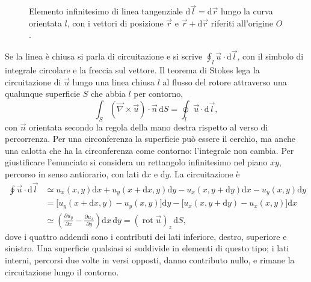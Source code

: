 \documentclass[11pt,a4paper]{article}
\newcommand{\nab}{\vec{\nabla}}
\newcommand{\dd}{\mathrm{d}}
\DeclareMathOperator{\rot}{rot}
\begin{document}
\begin{figure}[htbp]
	\caption{Elemento infinitesimo di linea tangenziale $\mathrm{d}\vec{l} = \mathrm{d}\vec{r}$ lungo la curva orientata $l$, con i vettori di posizione $\vec{r}$ e $\vec{r}+\mathrm{d}\vec{r}$ riferiti all'origine $O$.}
	\label{fig:elemento_linea_curva}
\end{figure}




Se la linea è chiusa si parla di circuitazione e si scrive $\oint_l\vec u\cdot\dd\vec l$, con il simbolo di integrale circolare e la freccia sul vettore. Il teorema di Stokes lega la circuitazione di $\vec u$ lungo una linea chiusa $l$ al flusso del rotore attraverso una qualunque superficie $S$ che abbia $l$ per contorno,
\[
\int_S(\nab\times\vec u)\cdot\vec n\,\dd S=\oint_l\vec u\cdot\dd\vec l ,
\]
con $\vec n$ orientata secondo la regola della mano destra rispetto al verso di percorrenza. Per una circonferenza la superficie può essere il cerchio, ma anche una calotta che ha la circonferenza come contorno: l'integrale non cambia. Per giustificare l'enunciato si considera un rettangolo infinitesimo nel piano $xy$, percorso in senso antiorario, con lati $\dd x$ e $\dd y$. La circuitazione è
\begin{align*}
\oint\vec u\cdot\dd\vec l&\simeq u_x(x,y)\dd x+u_y(x+\dd x,y)\dd y-u_x(x,y+\dd y)\dd x-u_y(x,y)\dd y\\
&=\bigl[u_y(x+\dd x,y)-u_y(x,y)\bigr]\dd y-\bigl[u_x(x,y+\dd y)-u_x(x,y)\bigr]\dd x\\
&\simeq\left(\frac{\partial u_y}{\partial x}-\frac{\partial u_x}{\partial y}\right)\dd x\,\dd y=(\rot\vec u)_z\,\dd S ,
\end{align*}
dove i quattro addendi sono i contributi dei lati inferiore, destro, superiore e sinistro. Una superficie qualsiasi si suddivide in elementi di questo tipo; i lati interni, percorsi due volte in versi opposti, danno contributo nullo, e rimane la circuitazione lungo il contorno.
\end{document}
